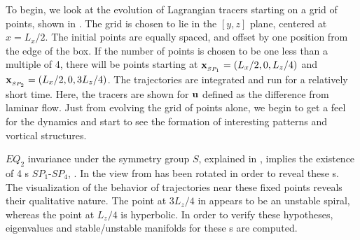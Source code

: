 \documentclass[letter,12pt,openany]{article}
\begin{document}
To begin, we look at the evolution of Lagrangian tracers starting on a grid of points, shown in . The grid
is chosen to lie in the $[y,z]$ plane, centered at $x = L_x/2$. The initial
points are equally spaced, and offset by one position from the edge
of the box. If the number of points is chosen to be one less than a
multiple of 4, there will be points starting at $\bold{x}_{_{SP_{1}}}=(L_x/2,0,L_z/4)$ and
$\bold{x}_{_{SP_{2}}}=(L_x/2,0,3L_z/4)$. The
trajectories are integrated and run for a relatively short time. Here, the tracers are shown for ${\bf u}$ defined as the difference from laminar flow. Just from evolving the grid of points alone, we begin to get a feel for the dynamics and start to see the formation of interesting patterns and vortical structures.




$EQ_2$ invariance under the symmetry group $S$, explained  in
, implies the existence of 4 \stagp s $SP_1$-$SP_4$,
.
In  the view
from  has been rotated in order
to reveal these \stagp s. The visualization of the behavior of trajectories near these
fixed points reveals their  qualitative nature.
The point at $3L_z/4$ in  appears to be an
unstable spiral, whereas the point at $L_z/4$ is hyperbolic. In order to verify these hypotheses, eigenvalues and
stable/unstable manifolds for these \stagp s are computed. \\
\end{document}
